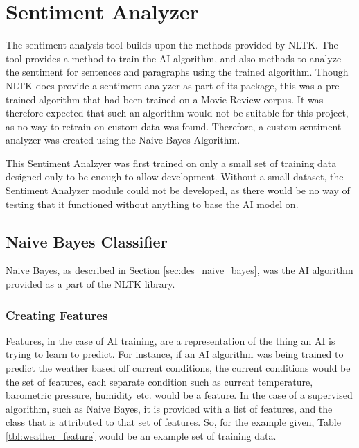 \section{Sentiment Analyzer}
\label{sec:imp_sentiment_analyzer}

The sentiment analysis tool builds upon the methods provided by NLTK. The tool provides a method to train the AI algorithm, and also methods to analyze the sentiment for sentences and paragraphs using the trained algorithm. Though NLTK does provide a sentiment analyzer as part of its package, this was a pre-trained algorithm that had been trained on a Movie Review corpus. It was therefore expected that such an algorithm would not be suitable for this project, as no way to retrain on custom data was found. Therefore, a custom sentiment analyzer was created using the Naive Bayes Algorithm.

This Sentiment Analzyer was first trained on only a small set of training data designed only to be enough to allow development. Without a small dataset, the Sentiment Analyzer module could not be developed, as there would be no way of testing that it functioned without anything to base the AI model on.
\subsection{Naive Bayes Classifier}
\label{sec:imp_naive_bayes}

Naive Bayes, as described in Section \ref{sec:des_naive_bayes}, was the AI algorithm provided as a part of the NLTK library.

\subsubsection{Creating Features}
\label{sec:imp_create_features}

Features, in the case of AI training, are a representation of the thing an AI is trying to learn to predict\cite{Mitchell1997}. For instance, if an AI algorithm was being trained to predict the weather based off current conditions, the current conditions would be the set of features, each separate condition such as  current temperature, barometric pressure, humidity etc. would be a feature. In the case of a supervised algorithm, such as Naive Bayes, it is provided with a list of features, and the class that is attributed to that set of features. So, for the example given, Table \ref{tbl:weather_feature} would be an example set of training data.

